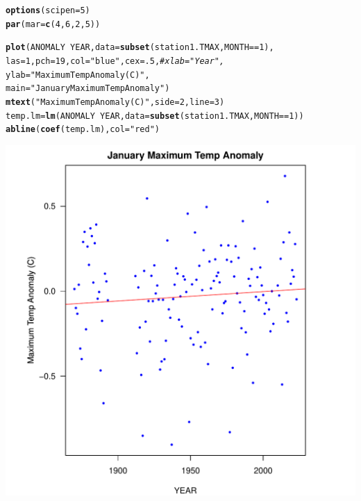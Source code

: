 \documentclass{article}\usepackage[]{graphicx}\usepackage[]{xcolor}
\makeatletter
\def\maxwidth{ %
  \ifdim\Gin@nat@width>\linewidth
    \linewidth
  \else
    \Gin@nat@width
  \fi
}
\newcommand{\hlnum}[1]{\textcolor[rgb]{0.686,0.059,0.569}{#1}}%
\newcommand{\hlstr}[1]{\textcolor[rgb]{0.192,0.494,0.8}{#1}}%
\newcommand{\hlcom}[1]{\textcolor[rgb]{0.678,0.584,0.686}{\textit{#1}}}%
\newcommand{\hlopt}[1]{\textcolor[rgb]{0,0,0}{#1}}%
\newcommand{\hlstd}[1]{\textcolor[rgb]{0.345,0.345,0.345}{#1}}%
\newcommand{\hlkwb}[1]{\textcolor[rgb]{0.69,0.353,0.396}{#1}}%
\newcommand{\hlkwc}[1]{\textcolor[rgb]{0.333,0.667,0.333}{#1}}%
\newcommand{\hlkwd}[1]{\textcolor[rgb]{0.737,0.353,0.396}{\textbf{#1}}}%
\newenvironment{kframe}{%
 \def\at@end@of@kframe{}%
 \ifinner\ifhmode%
  \def\at@end@of@kframe{\end{minipage}}%
  \begin{minipage}{\columnwidth}%
 \fi\fi%
 \def\FrameCommand##1{\hskip\@totalleftmargin \hskip-\fboxsep
 \colorbox{shadecolor}{##1}\hskip-\fboxsep
     \hskip-\linewidth \hskip-\@totalleftmargin \hskip\columnwidth}%
 \MakeFramed {\advance\hsize-\width
   \@totalleftmargin\z@ \linewidth\hsize
   \@setminipage}}%
 {\par\unskip\endMakeFramed%
 \at@end@of@kframe}
\newenvironment{knitrout}{}{} %
\makeatother
\begin{document}
\begin{knitrout}
\color{fgcolor}\begin{kframe}
\begin{alltt}
\hlkwd{options}\hlstd{(}\hlkwc{scipen}\hlstd{=}\hlnum{5}\hlstd{)}
\hlkwd{par}\hlstd{(}\hlkwc{mar}\hlstd{=}\hlkwd{c}\hlstd{(}\hlnum{4}\hlstd{,}\hlnum{6}\hlstd{,}\hlnum{2}\hlstd{,}\hlnum{5}\hlstd{))}

\hlkwd{plot}\hlstd{(ANOMALY} \hlopt{~} \hlstd{YEAR,} \hlkwc{data} \hlstd{=} \hlkwd{subset}\hlstd{(station1.TMAX, MONTH} \hlopt{==} \hlnum{1}\hlstd{),}
     \hlkwc{las}\hlstd{=}\hlnum{1}\hlstd{,} \hlkwc{pch}\hlstd{=}\hlnum{19}\hlstd{,} \hlkwc{col} \hlstd{=} \hlstr{"blue"}\hlstd{,} \hlkwc{cex}\hlstd{=}\hlnum{.5}\hlstd{,} \hlcom{#xlab = "Year", }
     \hlkwc{ylab} \hlstd{=} \hlstr{"Maximum Temp Anomaly (C)"}\hlstd{,}
     \hlkwc{main}\hlstd{=}\hlstr{"January Maximum Temp Anomaly"}\hlstd{)}
\hlkwd{mtext}\hlstd{(}\hlstr{"Maximum Temp Anomaly (C)"}\hlstd{,} \hlkwc{side} \hlstd{=} \hlnum{2}\hlstd{,} \hlkwc{line} \hlstd{=} \hlnum{3}\hlstd{)}
\hlstd{temp.lm} \hlkwb{=} \hlkwd{lm}\hlstd{(ANOMALY} \hlopt{~} \hlstd{YEAR,} \hlkwc{data} \hlstd{=} \hlkwd{subset}\hlstd{(station1.TMAX, MONTH} \hlopt{==} \hlnum{1}\hlstd{))}
\hlkwd{abline}\hlstd{(}\hlkwd{coef}\hlstd{(temp.lm),} \hlkwc{col} \hlstd{=} \hlstr{"red"}\hlstd{)}
\end{alltt}
\end{kframe}
\includegraphics[width=\maxwidth]{figure/unnamed-chunk-10-1} 
\end{knitrout}
\end{document}
